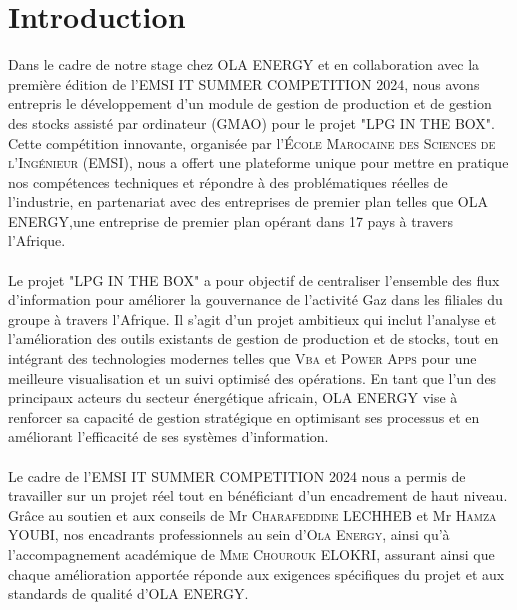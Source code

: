 \documentclass[a4paper, oneside, 12pt, final]{extreport}
\begin{document}

\tableofcontents

\listoffigures
\listoftables
\listofalgorithms
{}
\cleardoublepage

\newpage
{}
\chapter*{Introduction}
Dans le cadre de notre stage chez \textsc{OLA ENERGY} et en collaboration avec la première édition de l'\textsc{EMSI IT SUMMER COMPETITION 2024}, nous avons entrepris le développement d'un module de gestion de production et de gestion des stocks assisté par ordinateur (GMAO) pour le projet "\textsc{LPG IN THE BOX}". Cette compétition innovante, organisée par l'\textsc{École Marocaine des Sciences de l'Ingénieur} (\textsc{EMSI}), nous a offert une plateforme unique pour mettre en pratique nos compétences techniques et répondre à des problématiques réelles de l'industrie, en partenariat avec des entreprises de premier plan telles que \textsc{OLA ENERGY},une entreprise de premier plan opérant dans 17 pays à travers l'Afrique.
\\
\\
Le projet "\textsc{LPG IN THE BOX}" a pour objectif de centraliser l’ensemble des flux d’information pour améliorer la gouvernance de l’activité Gaz dans les filiales du groupe à travers l'Afrique. Il s’agit d’un projet ambitieux qui inclut l’analyse et l'amélioration des outils existants de gestion de production et de stocks, tout en intégrant des technologies modernes telles que \textsc{Vba} et \textsc{Power Apps} pour une meilleure visualisation et un suivi optimisé des opérations. En tant que l'un des principaux acteurs du secteur énergétique africain, \textsc{OLA ENERGY} vise à renforcer sa capacité de gestion stratégique en optimisant ses processus et en améliorant l'efficacité de ses systèmes d’information.
\\
\\
Le cadre de l'\textsc{EMSI IT SUMMER COMPETITION 2024} nous a permis de travailler sur un projet réel tout en bénéficiant d’un encadrement de haut niveau. Grâce au soutien et aux conseils de Mr \textsc{Charafeddine LECHHEB} et Mr \textsc{Hamza YOUBI}, nos encadrants professionnels au sein d'\textsc{Ola Energy}, ainsi qu'à l'accompagnement académique de \textsc{Mme Chourouk ELOKRI}, assurant ainsi que chaque amélioration apportée réponde aux exigences spécifiques du projet et aux standards de qualité d'\textsc{OLA ENERGY}.
\end{document}
